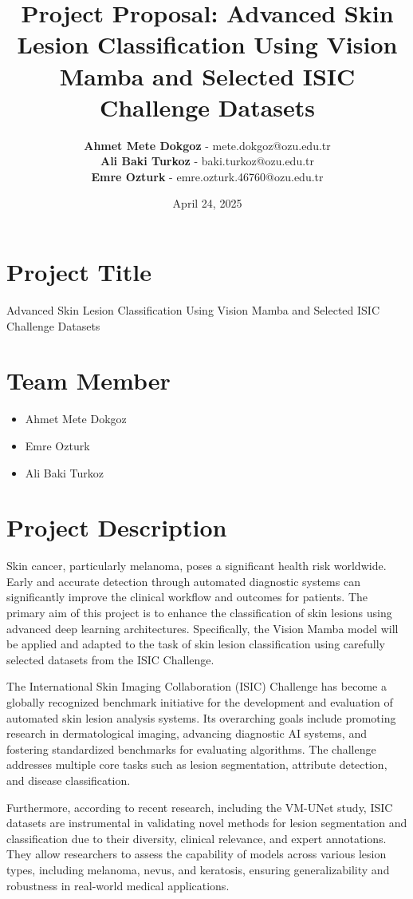 \documentclass[11pt]{article}
\title{Project Proposal: Advanced Skin Lesion Classification Using Vision Mamba and Selected ISIC Challenge Datasets}
\author{
  \textbf{Ahmet Mete Dokgoz} - mete.dokgoz@ozu.edu.tr \\
  \textbf{Ali Baki Turkoz} - baki.turkoz@ozu.edu.tr \\
  \textbf{Emre Ozturk} - emre.ozturk.46760@ozu.edu.tr
}
\date{April 24, 2025}
\begin{document}
\maketitle

\section*{Project Title}
Advanced Skin Lesion Classification Using Vision Mamba and Selected ISIC Challenge Datasets

\section*{Team Member}
\begin{itemize}
    \item Ahmet Mete Dokgoz
    \item Emre Ozturk
    \item Ali Baki Turkoz
\end{itemize}

\section*{Project Description}
Skin cancer, particularly melanoma, poses a significant health risk worldwide. Early and accurate detection through automated diagnostic systems can significantly improve the clinical workflow and outcomes for patients. The primary aim of this project is to enhance the classification of skin lesions using advanced deep learning architectures. Specifically, the Vision Mamba model will be applied and adapted to the task of skin lesion classification using carefully selected datasets from the ISIC Challenge.

The International Skin Imaging Collaboration (ISIC) Challenge has become a globally recognized benchmark initiative for the development and evaluation of automated skin lesion analysis systems. Its overarching goals include promoting research in dermatological imaging, advancing diagnostic AI systems, and fostering standardized benchmarks for evaluating algorithms. The challenge addresses multiple core tasks such as lesion segmentation, attribute detection, and disease classification.

Furthermore, according to recent research, including the VM-UNet study, ISIC datasets are instrumental in validating novel methods for lesion segmentation and classification due to their diversity, clinical relevance, and expert annotations. They allow researchers to assess the capability of models across various lesion types, including melanoma, nevus, and keratosis, ensuring generalizability and robustness in real-world medical applications.
\end{document}
